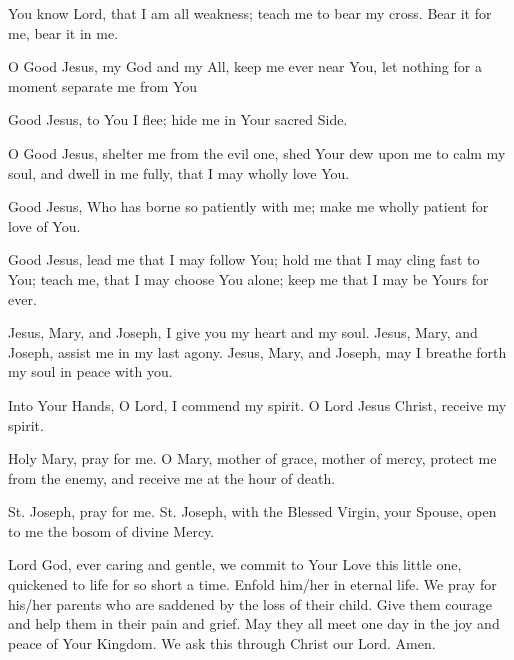 You know Lord, that I am all weakness; teach me to bear my cross.
Bear it for me, bear it in me.

O Good Jesus, my God and my All, keep me ever near You, let nothing for a moment separate me from You

Good Jesus, to You I flee;
hide me in Your sacred Side.

O Good Jesus, shelter me from the evil one, shed Your dew upon me to calm my soul, and dwell in me fully, that I may wholly love You.

Good Jesus, Who has borne so patiently with me;
make me wholly patient for love of You.

Good Jesus, lead me that I may follow You; hold me that I may cling fast to You;
teach me, that I may choose You alone; keep me that I may be Yours for ever.

Jesus, Mary, and Joseph, I give you my heart and my soul.
Jesus, Mary, and Joseph, assist me in my last agony.
Jesus, Mary, and Joseph, may I breathe forth my soul in peace with you.

Into Your Hands, O Lord, I commend my spirit.
O Lord Jesus Christ, receive my spirit.

Holy Mary, pray for me.
O Mary, mother of grace, mother of mercy, protect me from the enemy, and receive me at the hour of death.

St. Joseph, pray for me.
St. Joseph, with the Blessed Virgin, your Spouse, open to me the bosom of divine Mercy.

Lord God, ever caring and gentle, we commit to Your Love this little one, quickened to life for so short a time.
Enfold him/her in eternal life.
We pray for his/her parents who are saddened by the loss of their child.
Give them courage and help them in their pain and grief.
May they all meet one day in the joy and peace of Your Kingdom.
We ask this through Christ our Lord.
Amen.


\newpage